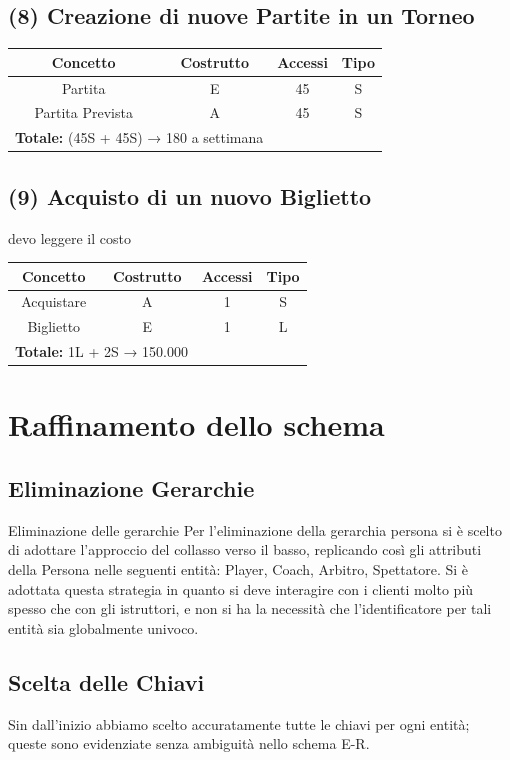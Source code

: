 \documentclass[a4paper,12pt]{report}
\begin{document}
\subsection*{(8) Creazione di nuove Partite in un Torneo}
\begin{center}
	\begin{tabular}{|c|c|c|c|}
		\hline\rowcolor{pink}
		Concetto & Costrutto & Accessi & Tipo\\
		\hline\hline		
		Partita & E & 45 & S\\
		Partita Prevista & A & 45 & S\\
		\hline
		\hline
		\multicolumn{2}{l}{%
			\textbf{Totale:} (45S + 45S)  → 180 a settimana} \\
		\hline
	\end{tabular}
\end{center}
\subsection*{(9) Acquisto di un nuovo Biglietto}
devo leggere il costo
\begin{center}
	\begin{tabular}{|c|c|c|c|}
		\hline\rowcolor{pink}
		Concetto & Costrutto & Accessi & Tipo\\
		\hline\hline		
		Acquistare & A & 1 & S\\
		Biglietto & E & 1 & L\\
		\hline
		\hline
		\multicolumn{2}{l}{%
			\textbf{Totale:} 1L + 2S → 150.000} \\
		\hline
	\end{tabular}
\end{center}
\section{Raffinamento dello schema}
\subsection*{Eliminazione Gerarchie}
Eliminazione delle gerarchie
Per l’eliminazione della gerarchia persona si è scelto di adottare l’approccio del collasso verso
il basso, replicando così gli attributi della Persona nelle seguenti entità: Player, Coach, Arbitro, Spettatore. 
Si è adottata questa strategia in
quanto si deve interagire con i clienti molto più spesso che con gli istruttori, e non si ha la
necessità che l’identificatore per tali entità sia globalmente univoco.
\subsection*{Scelta delle Chiavi}
Sin dall'inizio abbiamo scelto accuratamente tutte le chiavi per ogni entità; queste sono evidenziate senza ambiguità nello schema E-R.
\end{document}
